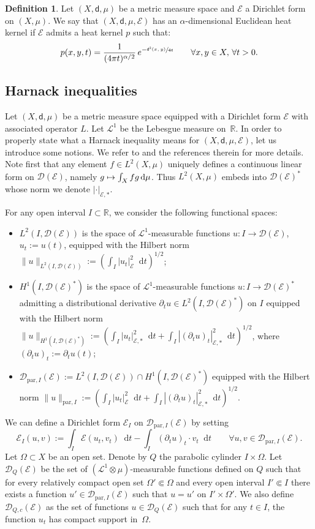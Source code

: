 \documentclass[10pt]{amsart}
\newcommand\mto{\mathchoice{\longmapsto}{\mapsto}{\mapsto}{\mapsto}}
\theoremstyle{plain}
\theoremstyle{definition}
\newtheorem{definition}[theorem]{Definition}
\newcommand{\setR}{\mathbb{R}}
\newcommand{\cE}{\mathcal{E}}
\newcommand{\cD}{\mathcal{D}}
\newcommand{\di}{\mathop{}\!\mathrm{d}}
\newcommand{\leb}{\mathscr{L}}
\newcommand{\dist}{\mathsf{d}}
\begin{document}
\begin{definition}\label{def:Euclideanheatkernel}
Let $(X,\dist,\mu)$ be a metric measure space and $\cE$ a Dirichlet form on $(X,\mu)$. We say that $(X,\dist,\mu,\cE)$ has an $\alpha$-dimensional Euclidean heat kernel if $\cE$ admits a heat kernel $p$ such that:
\[
p(x,y,t) = \frac{1}{(4 \pi t)^{\alpha/2}}\, e^{-\sfrac{\dist^2(x,y)}{4t}}\qquad \forall x,y \in X, \, \forall t>0.
\]
\end{definition}

\subsection*{Harnack inequalities}

Let $(X,\dist,\mu)$ be a metric measure space equipped with a Dirichlet form $\cE$ with associated operator $L$. Let $\leb^1$ be the Lebesgue measure on~$\setR$. In order to properly state what a Harnack inequality means for $(X,\dist,\mu,\cE)$, let us introduce some notions. We refer \eg to \cite{Sturm2} and the references therein for more details. Note first that any element $f \in L^2(X,\mu)$ uniquely defines a continuous linear form on $\cD(\cE)$, namely $g \mto \int_X fg \di \mu$. Thus $L^2(X,\mu)$ embeds into $\cD(\cE)^*$ whose norm we denote $|\cdot|_{\cE,*}$.

For any open interval $I \subset \setR$, we consider the following functional spaces:
\begin{itemize}
\item $L^2(I,\cD(\cE))$ is the space of $\leb^1$-measurable functions $u:I\to \cD(\cE)$, $u_t:=u(t)$, equipped with the Hilbert norm $\|u\|_{L^2(I,\cD(\cE))}:=(\int_I |u_t|_{\cE}^2 \di t)^{1/2}$;

\item $H^1(I,\cD(\cE)^*)$ is the space of $\leb^1$-measurable functions $u:I\to \cD(\cE)^*$ admitting a distributional derivative $\partial_t u \in L^2(I,\cD(\cE)^*)$ on $I$ equipped with the Hilbert norm $\|u\|_{H^1(I,\cD(\cE)^*)}:=(\int_I |u_t|_{\cE,*}^2 \di t + \int_I |(\partial_t u)_t |_{\cE,*}^2 \di t)^{1/2}$, where $(\partial_t u)_t:= \partial_t u(t)$;

\item $\cD_{\mathrm{par},I}(\cE):=L^2(I,\cD(\cE))\cap H^1(I,\cD(\cE)^*)$ equipped with the Hilbert norm $\|u\|_{\mathrm{par},I}:=(\int_I |u_t|_{\cE}^2 \di t + \int_I |(\partial_t u)_t |_{\cE,*}^2 \di t)^{1/2}$.
\end{itemize}
We can define a Dirichlet form $\cE_I$ on $\cD_{\mathrm{par},I}(\cE)$ by setting
\[
\cE_I(u,v):=\int_I\cE(u_t,v_t) \di t - \int_I (\partial_t u)_t \cdot v_t \di t \qquad \forall u, v \in \cD_{\mathrm{par},I}(\cE).
\]
Let $\Omega \subset X$ be an open set. Denote by $Q$ the parabolic cylinder $I \times \Omega$. Let $\cD_{Q}(\cE)$ be the set of $(\leb^1 \otimes \mu)$-measurable functions defined on $Q$ such that for every relatively compact open set $\Omega' \Subset \Omega$ and every open interval $I' \Subset I$ there exists a function $u' \in \cD_{\mathrm{par},I}(\cE)$ such that $u=u'$ on $I' \times \Omega'$. We also define $\cD_{Q,c}(\cE)$ as the set of functions $u \in \cD_{Q}(\cE)$ such that for any $t \in I$, the function $u_t$ has compact support in~$\Omega$.
\end{document}
